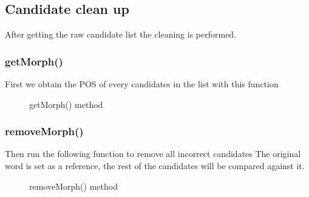 \documentclass[12pt,oneside,openright,a4paper]{cpe-english-project}
\begin{document}
\subsection{Candidate clean up}
After getting the raw candidate list the cleaning is performed.
\subsubsection{getMorph()}
First we obtain the POS of every candidates in the list with this function 
\begin{figure}[!h]\centering
\setlength{\fboxrule}{0.2mm} %
\setlength{\fboxsep}{1cm}
\caption{getMorph() method}\label{fig:getMorph() method}
\end{figure}
\subsubsection{removeMorph()}
Then run the following function to remove all incorrect candidates
The original word is set as a reference, the rest of the candidates will be compared against it.
\begin{figure}[!h]\centering
\setlength{\fboxrule}{0.2mm} %
\setlength{\fboxsep}{1cm}
\caption{removeMorph() method}\label{fig:removeMorph() method}
\end{figure}
\end{document}
